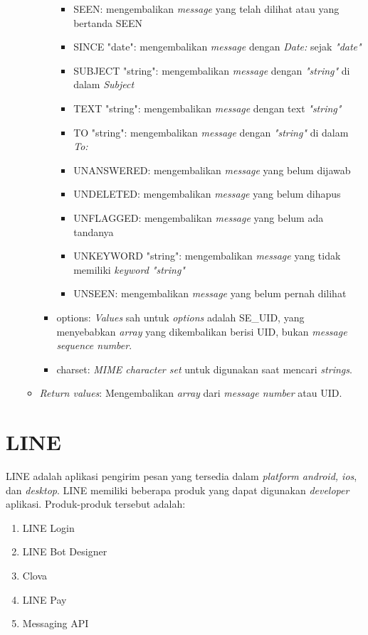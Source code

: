 \begin{itemize}
\begin{itemize}
\begin{itemize}
\begin{itemize}
  \item SEEN: mengembalikan \textit{message} yang telah dilihat atau yang bertanda SEEN
  \item SINCE "date": mengembalikan \textit{message} dengan \textit{Date:} sejak \textit{"date"}
  \item SUBJECT "string": mengembalikan \textit{message} dengan \textit{"string"} di dalam \textit{Subject}
  \item TEXT "string": mengembalikan \textit{message} dengan text \textit{"string"}
  \item TO "string": mengembalikan \textit{message} dengan \textit{"string"} di dalam \textit{To:}
  \item UNANSWERED: mengembalikan \textit{message} yang belum dijawab
  \item UNDELETED: mengembalikan \textit{message} yang belum dihapus
  \item UNFLAGGED: mengembalikan \textit{message} yang belum ada tandanya
  \item UNKEYWORD "string": mengembalikan \textit{message} yang tidak memiliki \textit{keyword "string"}
  \item UNSEEN: mengembalikan \textit{message} yang belum pernah dilihat
  \end{itemize}
\item options: \textit{Values} sah untuk \textit{options} adalah SE\_UID, yang menyebabkan \textit{array} yang dikembalikan berisi UID, bukan \textit{message sequence number}.
\item charset: \textit{MIME character set} untuk digunakan saat mencari \textit{strings}.
\end{itemize}
\item \textit{Return values}: Mengembalikan \textit{array} dari \textit{message number} atau UID.
\end{itemize}
 
\end{itemize}

\section{LINE \cite{LINE-developer}}
\label{sec:Line}
LINE adalah aplikasi pengirim pesan yang tersedia dalam \textit{platform android, ios}, dan \textit{desktop}. LINE memiliki beberapa produk yang dapat digunakan \textit{developer} aplikasi. Produk-produk tersebut adalah:
\begin{enumerate}
\item LINE Login
\item LINE Bot Designer
\item Clova
\item LINE Pay
\item Messaging API
\end{enumerate}

